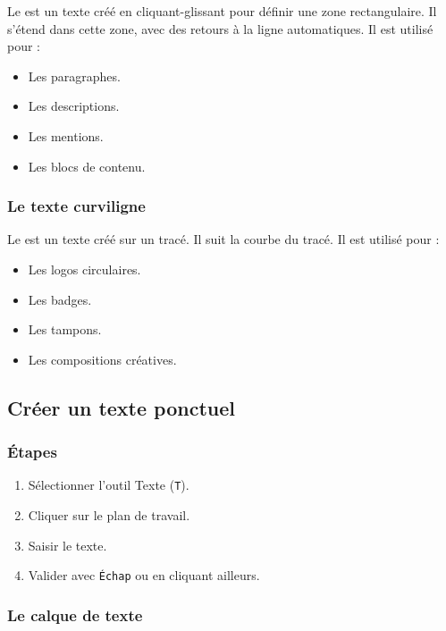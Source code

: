 Le  est un texte créé en cliquant-glissant pour définir une zone rectangulaire. Il s'étend dans cette zone, avec des retours à la ligne automatiques. Il est utilisé pour :

\begin{itemize}
    \item Les paragraphes.
    \item Les descriptions.
    \item Les mentions.
    \item Les blocs de contenu.
\end{itemize}

\subsubsection{Le texte curviligne}

Le  est un texte créé sur un tracé. Il suit la courbe du tracé. Il est utilisé pour :

\begin{itemize}
    \item Les logos circulaires.
    \item Les badges.
    \item Les tampons.
    \item Les compositions créatives.
\end{itemize}

\subsection{Créer un texte ponctuel}

\subsubsection{Étapes}

\begin{enumerate}
    \item Sélectionner l'outil Texte (\texttt{T}).
    \item Cliquer sur le plan de travail.
    \item Saisir le texte.
    \item Valider avec \texttt{Échap} ou en cliquant ailleurs.
\end{enumerate}

\subsubsection{Le calque de texte}

